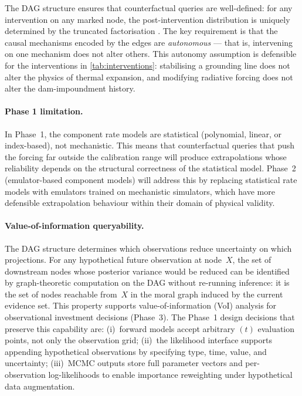 \documentclass[11pt]{article}
\begin{document}
The DAG structure ensures that counterfactual queries are well-defined: for any intervention on any marked node, the post-intervention distribution is uniquely determined by the truncated factorisation \citep{pearl2009causality}.  The key requirement is that the causal mechanisms encoded by the edges are \emph{autonomous} --- that is, intervening on one mechanism does not alter others.  This autonomy assumption is defensible for the interventions in \cref{tab:interventions}: stabilising a grounding line does not alter the physics of thermal expansion, and modifying radiative forcing does not alter the dam-impoundment history.

\paragraph{Phase 1 limitation.}  In Phase~1, the component rate models are statistical (polynomial, linear, or index-based), not mechanistic.  This means that counterfactual queries that push the forcing far outside the calibration range will produce extrapolations whose reliability depends on the structural correctness of the statistical model.  Phase~2 (emulator-based component models) will address this by replacing statistical rate models with emulators trained on mechanistic simulators, which have more defensible extrapolation behaviour within their domain of physical validity.

\paragraph{Value-of-information queryability.}  The DAG structure determines which observations reduce uncertainty on which projections.  For any hypothetical future observation at node~$X$, the set of downstream nodes whose posterior variance would be reduced can be identified by graph-theoretic computation on the DAG without re-running inference: it is the set of nodes reachable from~$X$ in the moral graph induced by the current evidence set.  This property supports value-of-information (VoI) analysis for observational investment decisions (Phase~3).  The Phase~1 design decisions that preserve this capability are: (i)~forward models accept arbitrary $(t)$ evaluation points, not only the observation grid; (ii)~the likelihood interface supports appending hypothetical observations by specifying type, time, value, and uncertainty; (iii)~MCMC outputs store full parameter vectors and per-observation log-likelihoods to enable importance reweighting under hypothetical data augmentation.
\end{document}
